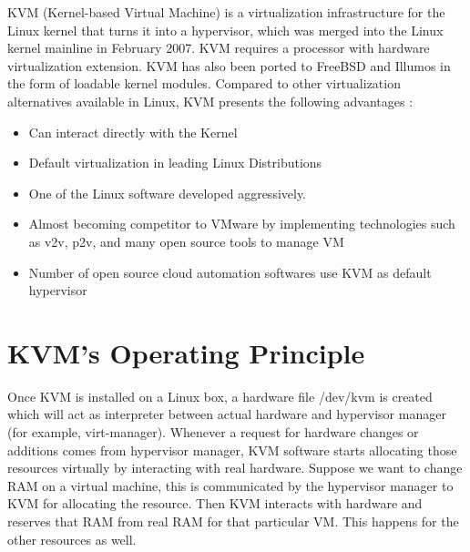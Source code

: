 KVM (Kernel-based Virtual Machine) is a virtualization infrastructure for the Linux kernel that turns it into a hypervisor, which was merged into the Linux kernel mainline in February 2007. KVM requires a processor with hardware virtualization extension. KVM has also been ported to FreeBSD and Illumos in the form of loadable kernel modules. 
Compared to other virtualization alternatives available in Linux, KVM presents the following advantages \cite{Reference20}:

    \begin{itemize}
	\item Can interact directly with the Kernel
	\item Default virtualization in leading Linux Distributions
	\item One of the Linux software developed aggressively.
	\item Almost becoming competitor to VMware by implementing technologies such as v2v, p2v, and many open source tools to manage VM
	\item Number of open source cloud automation softwares use KVM as default hypervisor 
    \end{itemize}


\section{KVM’s Operating Principle \cite{Reference20}}

Once KVM is installed on a Linux box, a hardware file /dev/kvm is created which will act as interpreter between actual hardware and hypervisor 
manager (for example, virt-manager). Whenever a request for hardware changes or additions comes from hypervisor manager, KVM software starts 
allocating those resources virtually by interacting with real hardware. Suppose we want to change RAM on a virtual machine, this is communicated
by the hypervisor manager to KVM for allocating the resource. Then KVM interacts with hardware and reserves that RAM from real RAM for that particular VM. This happens for the other resources as well.

